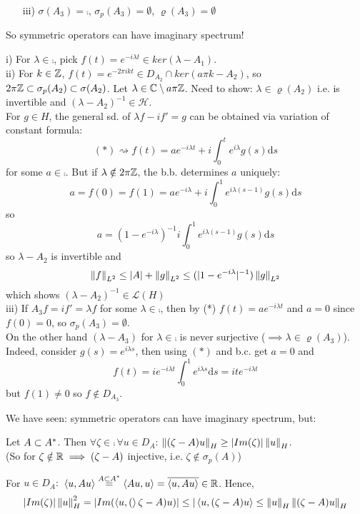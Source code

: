 \begin{example}
\begin{itemize}
		\item [iii)] $\sigma(A_3)=\comp$, $\sigma_p(A_3)=\emptyset$, $\varrho(A_3)=\emptyset$
	\end{itemize}
	So symmetric operators can have imaginary spectrum!
	\begin{pf}{}{}
		i) For $\lambda\in\comp$, pick $f(t)=e^{-i\lambda t}\in ker(\lambda-A_1)$.\\
		ii) For $k\in\mathbb{Z}$, $f(t)=e^{-2\pi ikt}\in D_{A_2}\cap ker(a\pi k-A_2)$,
		so $2\pi \mathbb{Z}\subset \sigma_p(A_2)\subset\sigma(A_2)$.
		Let $\lambda\in\mathbb{C}\setminus a\pi\mathbb{Z}$.
		Need to show: $\lambda\in\varrho(A_2)$ i.e.  is invertible and $(\lambda-A_2)^{-1}\in\mathcal{H}$.\\
		For $g\in H$, the general sd. of $\lambda f-if'=g$ can be obtained via variation of constant formula:
		$$
			(*)\rightsquigarrow f(t)=ae^{-i\lambda t}+i \int_0^t e^{i\lambda}g(s)\mathrm{d}s
		$$
		for some $a\in\comp$. But if $\lambda\notin2\pi\mathbb{Z}$, the b.b. determines $a$ uniquely:
		$$
			a=f(0)=f(1)=ae^{-i\lambda}+i\int_0^1e^{i\lambda(s-1)}g(s)\mathrm{d}s$$
		so
		$$
			a=(1-e^{-i\lambda})^{-1}i\int_0^1e^{i\lambda(s-1)}g(s)\mathrm{d}s
		$$
		so $\lambda-A_2$ is invertible and
		$$
			\left\|{f}\right\|_{L^2}\leq |A|+\left\|{g}\right\|_{L^2}\leq(|1-e^{-i\lambda}|^{-1})\left\|{g}\right\|_{L^2}
		$$
		which shows $(\lambda-A_2)^{-1}\in\mathcal{L}(H)$\\
		iii) If $A_3f=if'=\lambda f$ for some $\lambda\in\comp$, then by (*) $f(t)=ae^{-i\lambda t}$ and $a=0$ since $f(0)=0$, so $\sigma_p(A_3)=\emptyset$.\\
		On the other hand $(\lambda-A_3)$ for $\lambda\in\comp$ is never surjective ($\implies \lambda\in\varrho(A_3)$). Indeed, consider $g(s)=e^{i\lambda s}$, then using $(*)$ and b.c. get $a=0$ and
		$$
			f(t)=ie^{-i\lambda t}\int_0^1e^{i\lambda s} \mathrm{d}s=ite^{-i\lambda t}
		$$
		but $f(1)\neq0$ so $f\notin D_{A_3}$.
	\end{pf}
\end{example}
We have seen: symmetric operators can have imaginary spectrum, but:
\begin{lemma}\nl
	Let $A\subset {A}^*$. Then $\forall\zeta\in\comp\,\forall u\in D_A$: $\left\|{(\zeta-A)u}\right\|_H\geq |Im(\zeta)|\left\|{u}\right\|_H$.\\
	(So for $\zeta\notin\mathbb{R}\implies(\zeta-A)$ injective, i.e. $\zeta\notin\sigma_p(A)$)
	\begin{pf}{}{}
		For $u\in D_A:$ $\left<{u},{Au}\right>\stackrel{A\subset{A}^*}{=}\left<{Au},{u}\right>=\overline{\left<{u},{Au}\right>}\in\mathbb{R}$. Hence,
		$$
			|Im(\zeta)|\left\|{u}\right\|^2_H=|Im(\left<{u},{(}\right>\zeta-A)u)|\leq|\left<{u},{(\zeta-A)u}\right>\leq\left\|{u}\right\|_H\left\|{(\zeta-A)u}\right\|_H
		$$
	\end{pf}
\end{lemma}
